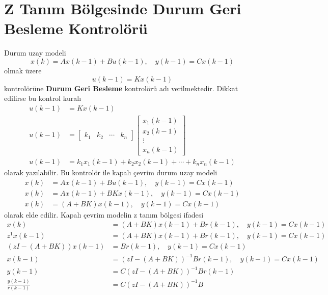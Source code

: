 \chapter{Z Tanım Bölgesinde Durum Geri Besleme Kontrolörü}
Durum uzay modeli
\begin{equation}
    x(k)=A x(k-1)+Bu(k-1),\quad y(k-1)=C x(k-1)
\end{equation}
olmak üzere 
\begin{equation}
    u(k-1)=K x(k-1)
\end{equation}
kontrolörüne \textbf{Durum Geri Besleme} kontrolörü adı verilmektedir. Dikkat edilirse bu kontrol kuralı
\begin{equation}
\begin{split}
    u(k-1)&=K x(k-1)\\
    u(k-1)&=\begin{bmatrix}k_1& k_2& \cdots& k_n\end{bmatrix} \begin{bmatrix}x_1(k-1)\\x_2(k-1)\\\vdots\\x_n(k-1)\end{bmatrix}\\
    u(k-1)&=k_1x_1(k-1)+k_2x_2(k-1)+\cdots+k_nx_n(k-1)
\end{split}
\end{equation}
olarak yazılabilir. Bu kontrolör ile kapalı çevrim durum uzay modeli
\begin{equation}
    \begin{split}
        x(k)&=A x(k-1)+Bu(k-1),\quad y(k-1)=C x(k-1)\\
        x(k)&=A x(k-1)+BKx(k-1),\quad y(k-1)=C x(k-1)\\
        x(k)&=(A+BK) x(k-1),\quad y(k-1)=C x(k-1)
    \end{split}
\end{equation}
olarak elde edilir. Kapalı çevrim modelin z tanım bölgesi ifadesi
\begin{equation}
    \begin{split}
        x(k)&=(A+BK) x(k-1)+B r(k-1),\quad y(k-1)=C x(k-1)\\
        z^1 x(k-1)&=(A+BK) x(k-1)+B r(k-1),\quad y(k-1)=C x(k-1)\\
        (zI-(A+BK)) x(k-1)&=B r(k-1),\quad y(k-1)=C x(k-1)\\
        x(k-1)&=(zI-(A+BK))^{-1} B r(k-1),\quad y(k-1)=C x(k-1)\\
        y(k-1)&=C(zI-(A+BK))^{-1}B r(k-1)\\
        \frac{y(k-1)}{r(k-1)}&=C(zI-(A+BK))^{-1}B
    \end{split}
\end{equation}
